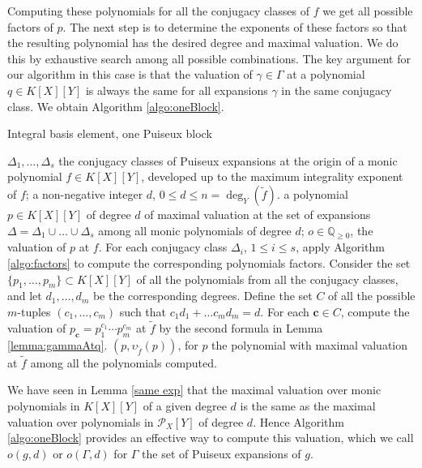 \documentclass[a4paper,11pt]{amsart}%
\theoremstyle{definition}
\theoremstyle{plain}
\theoremstyle{remark}
\newcommand{\Q}{{\mathbb Q}}
\newcommand{\Px}{{\mathcal{P}_X}}
\begin{document}
\vspace{.5cm}

Computing these polynomials for all the conjugacy classes of $f$ we get all possible factors of $p$.
The next step is to determine the exponents of these factors so that the resulting polynomial has the desired degree and maximal valuation. We do this by exhaustive search among all possible combinations.
The key argument for our algorithm in this case is that the valuation of $\gamma \in \Gamma$ at a polynomial $q \in K[X][Y]$ is always the same for all expansions $\gamma$ in the same conjugacy class.
We obtain Algorithm \ref{algo:oneBlock}.


\begin{algorithm}[h]                      %
\caption{Integral basis element, one Puiseux block}          %
\label{algo:oneBlock}
\begin{algorithmic}[1]
\REQUIRE $\Delta_1, \dots, \Delta_s$ the conjugacy classes of Puiseux expansions at the origin of a monic polynomial $f \in K[X][Y]$, developed up to the maximum integrality exponent of $f$; a non-negative integer $d$, $0 \leq d \leq n = \deg_Y(\tilde f)$.
\ENSURE a polynomial $p \in K[X][Y]$ of degree $d$ of maximal valuation at the set of expansions $\Delta = \Delta_1 \cup \dots \cup \Delta_s$ among all monic polynomials of degree $d$; $o \in \Q_{\geq 0}$, the valuation of $p$ at $f$.
\STATE For each conjugacy class $\Delta_i$, $1 \le i \le s$, apply Algorithm \ref{algo:factors} to compute the corresponding polynomials factors.
\STATE Consider the set $\{p_1, \dots, p_m\} \subset K[X][Y]$ of all the polynomials from all the conjugacy classes, and let $d_1, \dots, d_m$ be the corresponding degrees.
\STATE Define the set $C$ of all the possible $m$-tuples $(c_1, \dots, c_m)$ such that $c_1 d_1  + \dots c_m d_m = d$.
\STATE For each $\bm{c} \in C$, compute the valuation of $p_{\bm c} = p_1^{c_1}\cdots p_m^{c_m}$ at $\tilde f$ by the second formula in Lemma \ref{lemma:gammaAtq}.
\RETURN $(p, \upsilon_{\tilde f}(p))$, for $p$ the polynomial with maximal valuation at $\tilde f$ among all the polynomials computed.
\end{algorithmic}
\end{algorithm}


We have seen in Lemma \ref{same exp} that the maximal valuation over monic polynomials in $K[X][Y]$ of a given degree $d$ is the same as the maximal valuation over polynomials in $\Px[Y]$ of degree $d$. Hence Algorithm \ref{algo:oneBlock} provides an effective way to compute this valuation, which we call $o(g,d)$ or $o(\Gamma, d)$ for $\Gamma$ the set of Puiseux expansions of $g$.
\end{document}
